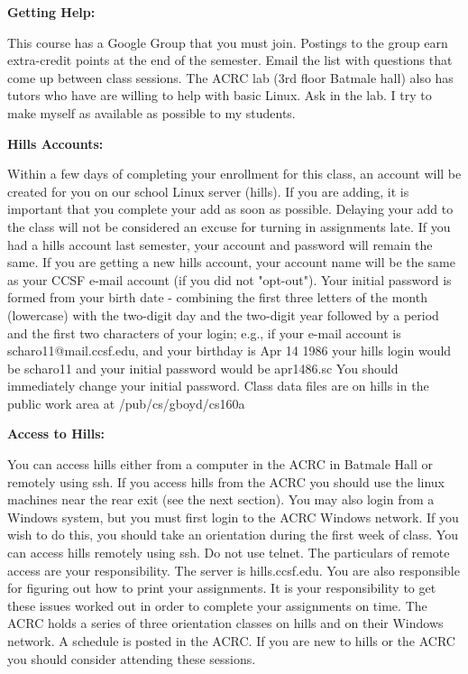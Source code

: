 \documentclass[11pt]{article}
\begin{document}
\hspace{3mm}

\textbf{Getting Help:}

\hspace{3mm}

This course has a Google Group that you must join. Postings to the group earn
extra-credit points at the end of the semester. Email the list with questions
that come up between class sessions. The ACRC lab (3rd floor Batmale hall) also
has tutors who have are willing to help with basic Linux. Ask in the lab. I try
to make myself as available as possible to my students. 

\hspace{3mm}

\textbf{Hills Accounts:}

\hspace{3mm}

Within a few days of completing your enrollment for this class, an account will
be created for you on our school Linux server (hills). If you are adding, it is
important that you complete your add as soon as possible. Delaying your add to
the class will not be considered an excuse for turning in assignments late. If
you had a hills account last semester, your account and password will remain
the same. If you are getting a new hills account, your account name will be the
same as your CCSF e-mail account (if you did not "opt-out"). Your initial
password is formed from your birth date - combining the first three letters of
the month (lowercase) with the two-digit day and the two-digit year followed by
a period and the first two characters of your login; e.g., if your e-mail
account is scharo11@mail.ccsf.edu, and your birthday is Apr 14 1986 your hills
login would be scharo11 and your initial password would be apr1486.sc You
should immediately change your initial password.  Class data files are on hills
in the public work area at /pub/cs/gboyd/cs160a

\hspace{3mm}

\textbf{Access to Hills:}

\hspace{3mm}

You can access hills either from a computer in the ACRC in Batmale Hall or
remotely using ssh. If you access hills from the ACRC you should use the linux
machines near the rear exit (see the next section). You may also login from a
Windows system, but you must first login to the ACRC Windows network. If you
wish to do this, you should take an orientation during the first week of class.
You can access hills remotely using ssh. Do not use telnet. The particulars of
remote access are your responsibility.  The server is hills.ccsf.edu. You are
also responsible for figuring out how to print your assignments. It is your
responsibility to get these issues worked out in order to complete your
assignments on time.  The ACRC holds a series of three orientation classes on
hills and on their Windows network. A schedule is posted in the ACRC. If you
are new to hills or the ACRC you should consider attending these sessions.
\end{document}
